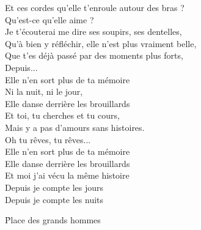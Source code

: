 \documentclass{novel}
\begin{document}
\begin{multicols}{2}
Et ces cordes qu'elle t'enroule autour des bras ? \\
Qu'est-ce qu'elle aime ? \\
Je t'écouterai me dire ses soupirs, ses dentelles, \\
Qu'à bien y réfléchir, elle n'est plus vraiment belle, \\
Que t'es déjà passé par des moments plus forts, \\
Depuis... \\
Elle n'en sort plus de ta mémoire \\
Ni la nuit, ni le jour, \\
Elle danse derrière les brouillards \\
Et toi, tu cherches et tu cours, \\
Mais y a pas d'amours sans histoires. \\
Oh tu rêves, tu rêves... \\
Elle n'en sort plus de ta mémoire \\
Elle danse derrière les brouillards \\
Et moi j'ai vécu la même histoire \\
Depuis je compte les jours \\
Depuis je compte les nuits
\end{multicols}

\newpage
\small

\h*{Place des grands hommes}
\end{document}

